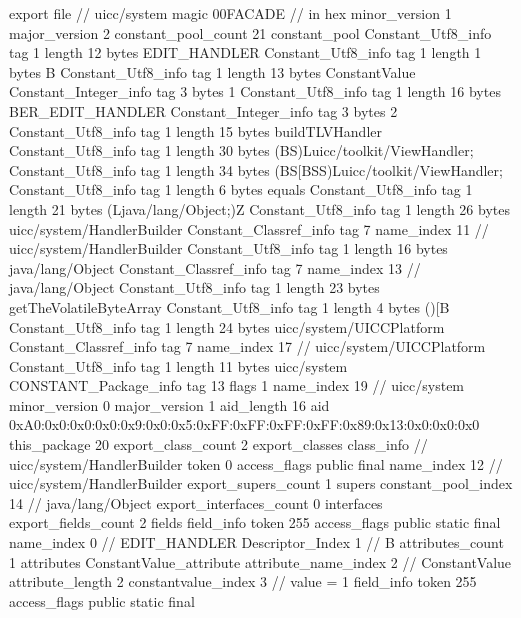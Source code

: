 export file {		// uicc/system
	magic	00FACADE		 // in hex
	minor_version	1
	major_version	2
	constant_pool_count	21
	constant_pool {
		Constant_Utf8_info {
			tag	1
			length	12
			bytes	EDIT_HANDLER
		}
		Constant_Utf8_info {
			tag	1
			length	1
			bytes	B
		}
		Constant_Utf8_info {
			tag	1
			length	13
			bytes	ConstantValue
		}
		Constant_Integer_info {
			tag	3
			bytes	1
		}
		Constant_Utf8_info {
			tag	1
			length	16
			bytes	BER_EDIT_HANDLER
		}
		Constant_Integer_info {
			tag	3
			bytes	2
		}
		Constant_Utf8_info {
			tag	1
			length	15
			bytes	buildTLVHandler
		}
		Constant_Utf8_info {
			tag	1
			length	30
			bytes	(BS)Luicc/toolkit/ViewHandler;
		}
		Constant_Utf8_info {
			tag	1
			length	34
			bytes	(BS[BSS)Luicc/toolkit/ViewHandler;
		}
		Constant_Utf8_info {
			tag	1
			length	6
			bytes	equals
		}
		Constant_Utf8_info {
			tag	1
			length	21
			bytes	(Ljava/lang/Object;)Z
		}
		Constant_Utf8_info {
			tag	1
			length	26
			bytes	uicc/system/HandlerBuilder
		}
		Constant_Classref_info {
			tag	7
			name_index	11		// uicc/system/HandlerBuilder
		}
		Constant_Utf8_info {
			tag	1
			length	16
			bytes	java/lang/Object
		}
		Constant_Classref_info {
			tag	7
			name_index	13		// java/lang/Object
		}
		Constant_Utf8_info {
			tag	1
			length	23
			bytes	getTheVolatileByteArray
		}
		Constant_Utf8_info {
			tag	1
			length	4
			bytes	()[B
		}
		Constant_Utf8_info {
			tag	1
			length	24
			bytes	uicc/system/UICCPlatform
		}
		Constant_Classref_info {
			tag	7
			name_index	17		// uicc/system/UICCPlatform
		}
		Constant_Utf8_info {
			tag	1
			length	11
			bytes	uicc/system
		}
		CONSTANT_Package_info {
			tag	13
			flags	1
			name_index	19		// uicc/system
			minor_version	0
			major_version	1
			aid_length	16
			aid	0xA0:0x0:0x0:0x0:0x9:0x0:0x5:0xFF:0xFF:0xFF:0xFF:0x89:0x13:0x0:0x0:0x0
		}
	}
	this_package	20
	export_class_count	2
	export_classes {
		class_info {		// uicc/system/HandlerBuilder
			token	0
			access_flags	public final
			name_index	12		// uicc/system/HandlerBuilder
			export_supers_count	1
			supers {
				constant_pool_index	14		// java/lang/Object
			}
			export_interfaces_count	0
			interfaces {
			}
			export_fields_count	2
			fields {
			field_info {
				token	255
				access_flags	public static final
				name_index	0		// EDIT_HANDLER
				Descriptor_Index	1		// B
				attributes_count	1
				attributes {
				ConstantValue_attribute {
					attribute_name_index	2		// ConstantValue
					attribute_length	2
					constantvalue_index	3		// value = 1
				}
				}
			}
			field_info {
				token	255
				access_flags	public static final
}}}}}
